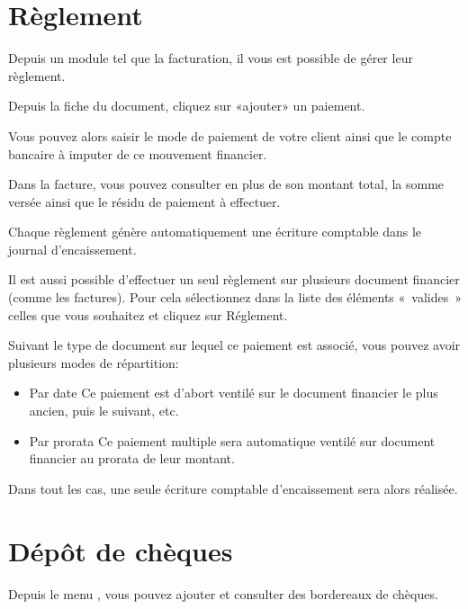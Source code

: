 \documentclass[a4paper,10pt,oneside,french]{sphinxmanual}
\begin{document}
\section{Règlement}
\label{\detokenize{payoff/payoff:reglement}}\label{\detokenize{payoff/payoff::doc}}
Depuis un module tel que la facturation, il vous est possible de gérer leur règlement.

Depuis la fiche du document, cliquez sur «ajouter» un paiement.
\begin{quote}

\noindent{}
\end{quote}

Vous pouvez alors saisir le mode de paiement de votre client ainsi que le compte bancaire à imputer de ce mouvement financier.

Dans la facture, vous pouvez consulter en plus de son montant total, la somme versée ainsi que le résidu de paiement à effectuer.

Chaque règlement génère automatiquement une écriture comptable dans le journal d’encaissement.

Il est aussi possible d’effectuer un seul règlement sur plusieurs document financier (comme les factures). Pour cela sélectionnez dans la liste des éléments « valides » celles que vous souhaitez et cliquez sur Réglement.
\begin{quote}

\noindent{}
\end{quote}

Suivant le type de document sur lequel ce paiement est associé, vous pouvez avoir plusieurs modes de répartition:
\begin{itemize}
\item {} 
Par date
Ce paiement est d’abort ventilé sur le document financier le plus ancien, puis le suivant, etc.

\item {} 
Par prorata
Ce paiement multiple sera automatique ventilé sur document financier au prorata de leur montant.

\end{itemize}

Dans tout les cas, une seule écriture comptable d’encaissement sera alors réalisée.


\section{Dépôt de chèques}
\label{\detokenize{payoff/deposit::doc}}\label{\detokenize{payoff/deposit:depot-de-cheques}}
Depuis le menu , vous pouvez ajouter et consulter des bordereaux de chèques.
\begin{quote}

\noindent{}
\end{quote}
\end{document}
